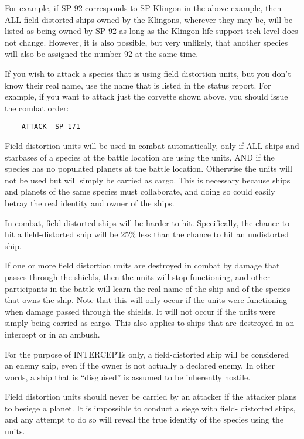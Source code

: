 \documentclass[10pt,titlepage]{article}
\begin{document}
For example, if SP 92 corresponds to SP Klingon in the above example, then
ALL field-distorted ships owned by the Klingons, wherever they may be, will be
listed as being owned by SP 92 as long as the Klingon life support tech level
does not change.  However, it is also possible, but very unlikely, that another
species will also be assigned the number 92 at the same time.

If you wish to attack a species that is using field distortion units, but you
don't know their real name, use the name that is listed in the status report.
For example, if you want to attack just the corvette shown above, you should
issue the combat order:

\begin{verbatim}
	ATTACK	SP 171\end{verbatim} 

Field distortion units will be used in combat automatically, only if ALL ships
and starbases of a species at the battle location are using the units, AND if
the species has no populated planets at the battle location.  Otherwise the
units will not be used but will simply be carried as cargo.  This is necessary
because ships and planets of the same species must collaborate, and doing so
could easily betray the real identity and owner of the ships.

In combat, field-distorted ships will be harder to hit.  Specifically, the
chance-to-hit a field-distorted ship will be 25\% less than the chance to hit
an undistorted ship.

If one or more field distortion units are destroyed in combat by damage that
passes through the shields, then the units will stop functioning, and other
participants in the battle will learn the real name of the ship and of the
species that owns the ship.  Note that this will only occur if the units were
functioning when damage passed through the shields.  It will not occur if the
units were simply being carried as cargo.  This also applies to ships that are
destroyed in an intercept or in an ambush.

For the purpose of INTERCEPTs only, a field-distorted ship will be considered
an enemy ship, even if the owner is not actually a declared enemy.  In other
words, a ship that is ``disguised'' is assumed to be inherently hostile.

Field distortion units should never be carried by an attacker if the attacker
plans to besiege a planet.  It is impossible to conduct a siege with field-
distorted ships, and any attempt to do so will reveal the true identity of the
species using the units.
\end{document}
